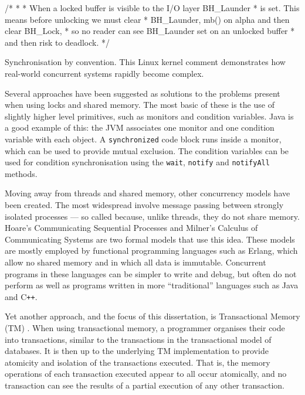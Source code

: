 \documentclass[12pt,a4paper,oneside,openright]{report}
\newcommand{\mycaption}[2]{\caption[#1]{#1 #2}}
\newcommand{\javaKeyword}[1]{\texttt{#1}}
\newcommand{\javaMethod}[1]{\texttt{#1}}
\begin{document}
\begin{Listing}[hbtp]
  \begin{JavaCode}
    /* * * When a locked buffer is visible to the I/O layer BH_Launder
    * is set. This means before unlocking we must clear * BH_Launder,
    mb() on alpha and then clear BH_Lock, * so no reader can see
    BH_Launder set on an unlocked buffer * and then risk to deadlock.
    */
  \end{JavaCode}
  \mycaption{Synchronisation by convention.}{This Linux kernel comment
    demonstrates how real-world concurrent systems rapidly become
    complex.}
  \label{lst:syncConv}
\end{Listing}

Several approaches have been suggested as solutions to the problems
present when using locks and shared memory. The most basic of these is
the use of slightly higher level primitives, such as monitors and
condition variables. Java is a good example of this: the JVM
associates one monitor and one condition variable with each object. A
\javaKeyword{synchronized} code block runs inside a monitor, which can
be used to provide mutual exclusion. The condition variables can be
used for condition synchronisation using the \javaMethod{wait},
\javaMethod{notify} and \javaMethod{notifyAll} methods.

Moving away from threads and shared memory, other concurrency models
have been created. The most widespread involve message passing between
strongly isolated processes --- so called because, unlike threads,
they do not share memory. Hoare's Communicating Sequential Processes
\cite{CSP} and Milner's Calculus of Communicating Systems \cite{CCS}
are two formal models that use this idea. These models are mostly
employed by functional programming languages such as Erlang, which
allow no shared memory and in which all data is immutable. Concurrent
programs in these languages can be simpler to write and debug, but
often do not perform as well as programs written in more
``traditional'' languages such as Java and C\texttt{++}.

Yet another approach, and the focus of this dissertation, is
Transactional Memory (TM) \cite{TMBook}. When using transactional
memory, a programmer organises their code into transactions, similar
to the transactions in the transactional model of databases. It is
then up to the underlying TM implementation to provide atomicity and
isolation of the transactions executed. That is, the memory operations
of each transaction executed appear to all occur atomically, and no
transaction can see the results of a partial execution of any other
transaction.
\end{document}
